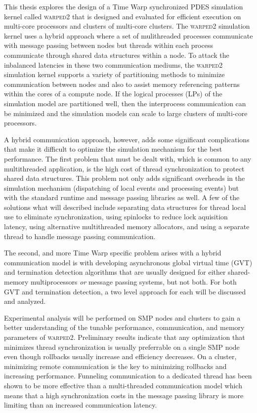 \documentclass[11pt]{book}
\begin{document}
This thesis explores the design of a Time Warp synchronized PDES simulation kernel called
\textsc{warped2} that is designed and evaluated for efficient execution on multi-core
processors and clusters of multi-core clusters.  The \textsc{warped2} simulation kernel
uses a hybrid approach where a set of mulithreaded processes communicate with message
passing between nodes but threads within each process communicate through shared data
structures within a node.  To attack the inbalanced latencies in these two communication
mediums, the \textsc{warped2} simulation kernel supports a variety of partitioning methods
to minimize communication between nodes and also to assist memory referencing patterns
within the cores of a compute node.  If the logical processes (LPs) of the simulation
model are partitioned well, then the interprocess communication can be minimized and the
simulation models can scale to large clusters of multi-core processors.

A hybrid communication approach, however, adds some significant complications that make it
difficult to optimize the simulation mechanism for the best performance.  The first
problem that must be dealt with, which is common to any multithreaded application, is the
high cost of thread synchronization to protect shared data structures.  This problem not
only adds significant overheads in the simulation mechanism (dispatching of local events
and processing events) but with the standard runtime and message passing libraries as
well.  A few of the solutions what will described include separating data structures for
thread local use to eliminate synchronization, using spinlocks to reduce lock aquisition
latency, using alternative multithreaded memory allocators, and using a separate thread to
handle message passing communication.

The second, and more Time Warp specific problem arises with a hybrid communication model
is with developing asynchronous global virtual time (GVT) and termination detection
algorithms that are usually designed for either shared-memory multiprocessors \emph{or}
message passing systems, but not both.  For both GVT and termination detection, a two
level approach for each will be discussed and analyzed.

Experimental analysis will be performed on SMP nodes and clusters to gain a better
understanding of the tunable performance, communication, and memory parameters of
\textsc{warped2}.  Preliminary results indicate that any optimization that minimizes
thread synchronization is usually preferrable on a single SMP node even though rollbacks
usually increase and efficiency decreases.  On a cluster, minimizing remote communication
is the key to minimizing rollbacks and increasing performance.  Funneling communication to
a dedicated thread has been shown to be more effective than a multi-threaded communication
model which means that a high synchronization costs in the message passing library is more
limiting than an increased communication latency.
\end{document}

